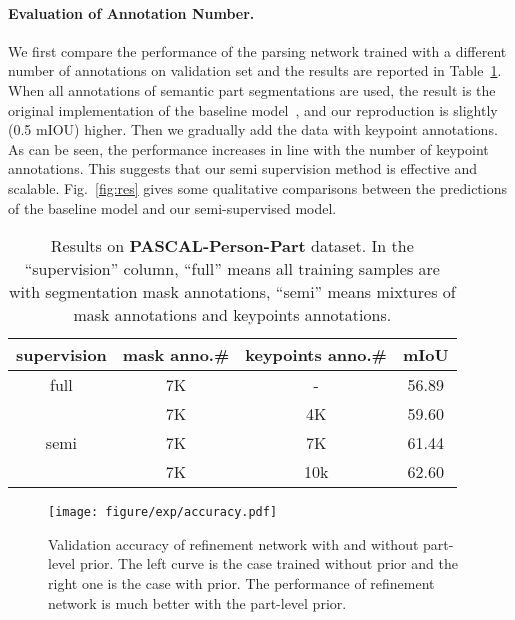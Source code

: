 \documentclass[10pt,twocolumn,letterpaper]{article}
\begin{document}
\paragraph{Evaluation of Annotation Number.}
We first compare the performance of the parsing network trained with a different number of annotations on validation set and the results are reported in Table~\ref{tab:annotation}. When all annotations of semantic part segmentations are used, the result is the original implementation of the baseline model~\cite{chen2016attention}, and our reproduction is slightly (0.5 mIOU) higher. Then we gradually add the data with keypoint annotations. As can be seen, the performance increases in line with the number of keypoint annotations. This suggests that our semi supervision method is effective and scalable. Fig.~\ref{fig:res} gives some qualitative comparisons between the predictions of the baseline model and our semi-supervised model.
\begin{table}[t]
	\begin{center}
\begin{small}
		\begin{tabular}{c|c|c|c}
			\hline
			supervision & mask anno.\# & keypoints anno.\# & mIoU\\
			\hline
			\hline
			full & 7K & - & 56.89\\
            \hline
			\multirow{3}{*}{semi} & 7K & 4K & 59.60\\
			     & 7K & 7K & 61.44\\
			     & 7K & 10k  & 62.60\\
            \hline
		\end{tabular}
\end{small}
	\end{center}
\vspace{-3mm}
	\caption{Results on \textbf{PASCAL-Person-Part} dataset. In the ``supervision'' column, ``full'' means all training samples are with segmentation mask annotations, ``semi'' means mixtures of mask annotations and keypoints annotations. }
	\label{tab:annotation}
\vspace{-3mm}
\end{table}

\begin{figure}[t]
\begin{center}
   \texttt{[image: figure/exp/accuracy.pdf]}
\end{center}
\vspace{-4mm}
   \caption{Validation accuracy of refinement network with and without part-level prior. The left curve is the case trained without prior and the right one is the case with prior. The performance of refinement network is much better with the part-level prior.}
\label{fig:accuracy}
\vspace{-2mm}
\end{figure}
\vspace{-2mm}
\end{document}
